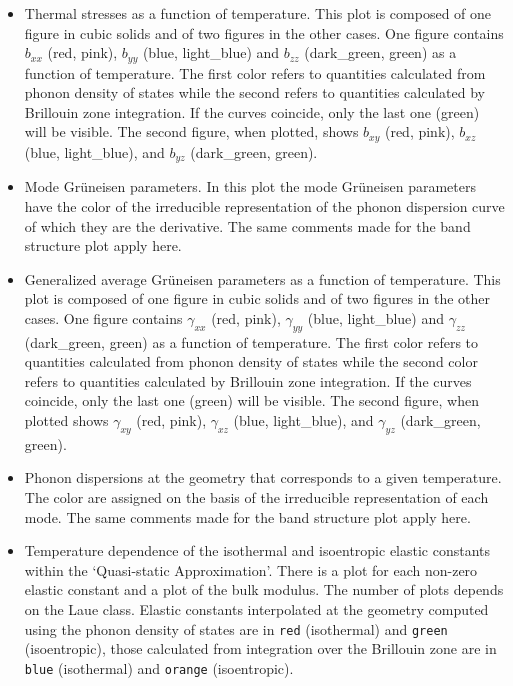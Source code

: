 \documentclass[12pt,a4paper]{article}
\begin{document}
\begin{itemize}
\item
Thermal stresses as a function of temperature. This plot is composed of
one figure in cubic solids and of two figures in the other cases. 
One figure contains $b_{xx}$ (red, pink), $b_{yy}$ (blue, light\_blue)
and $b_{zz}$ (dark\_green, green) as a function of temperature. 
The first color refers to quantities calculated from phonon density of states
while the second refers to quantities calculated by Brillouin zone
integration. If the curves coincide, only the last one (green) will 
be visible. The second figure, when plotted, shows $b_{xy}$ (red, pink), 
$b_{xz}$ (blue, light\_blue), and $b_{yz}$ (dark\_green, green).

\item
Mode Gr\"uneisen parameters. In this plot the mode Gr\"uneisen parameters have
the color of the irreducible representation of the phonon dispersion curve
of which they are the derivative.
The same comments made for the band structure plot apply here.

\item
Generalized average Gr\"uneisen parameters as a function of temperature. 
This plot is composed of one figure in cubic solids and of two figures in 
the other cases. 
One figure contains $\gamma_{xx}$ (red, pink), $\gamma_{yy}$ (blue, light\_blue)
and $\gamma_{zz}$ (dark\_green, green) as a function of temperature. 
The first color refers to quantities calculated from phonon density of states
while the second color refers to quantities calculated by Brillouin zone
integration.
If the curves coincide, only the last one (green) will be visible. 
The second figure, 
when plotted shows $\gamma_{xy}$ (red, pink), $\gamma_{xz}$ 
(blue, light\_blue), and $\gamma_{yz}$ (dark\_green, green).

\item
Phonon dispersions at the geometry that corresponds to a given temperature. 
The color are assigned on the basis of the irreducible representation of
each mode. The same comments made for the band structure plot apply here.

\item
Temperature dependence of the isothermal and isoentropic elastic constants 
within the 
`Quasi-static Approximation'. There is a plot for each non-zero
elastic constant and a plot of the bulk modulus. The number of plots 
depends on the Laue class. 
Elastic constants 
interpolated at the geometry computed using the phonon density of states 
are in \texttt{red} (isothermal) and \texttt{green} (isoentropic), 
those calculated from integration over the 
Brillouin zone are in \texttt{blue} (isothermal) and \texttt{orange} 
(isoentropic).


\end{itemize}
\end{document}
